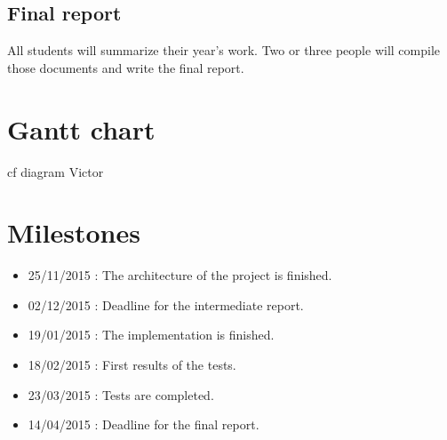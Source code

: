 \documentclass[11pt,a4paper]{article}
\begin{document}
\subsection{Final report}

All students will summarize their year's work. Two or three people will compile those documents and write the final report.

\section{Gantt chart}

cf diagram Victor

\section{Milestones}

\begin{itemize}
	\item 25/11/2015 : The architecture of the project is finished.
	\item 02/12/2015 : Deadline for the intermediate report.
	\item 19/01/2015 : The implementation is finished.
	\item 18/02/2015 : First results of the tests.
	\item 23/03/2015 : Tests are completed.
	\item 14/04/2015 : Deadline for the final report.
\end{itemize}
\end{document}

